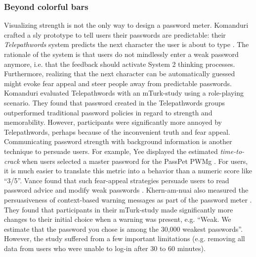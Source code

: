 	\subsubsection{Beyond colorful bars}
	Visualizing strength is not the only way to design a password meter. Komanduri \etal crafted a sly prototype to tell users their passwords are predictable: their \textit{Telepathwords} system predicts the next character the user is about to type \cite{Komanduri2014Telepathwords}. The rationale of the system is that users do not mindlessly enter a weak password anymore, i.e. that the feedback should activate System 2 thinking processes. Furthermore, realizing that the next character can be automatically guessed might evoke fear appeal and steer people away from predictable passwords. Komanduri \etal evaluated Telepathwords with an \gls{mTurk}-study using a role-playing scenario. They found that password created in the Telepathwords groups outperformed traditional password policies in regard to strength and memorability. However, participants were significantly more annoyed by Telepathwords, perhaps because of the inconvenient truth and fear appeal. 
	Communicating password strength with background information is another technique to persuade users. For example, Yee \etal displayed the estimated \textit{time-to-crack} when users selected a master password for the PassPet \gls{PWMg} \cite{Yee2006Passpet}. For users, it is much easier to translate this metric into a behavior than a numeric score like ``3/5''. Vance \etal found that such fear-appeal strategies persuade users to read password advice and modify weak passwords \cite{Vance2013FearAppeals}. Khern-am-nuai \etal also measured the persuasiveness of context-based warning messages as part of the password meter \cite{Khern-am-nuai2017ContextBasedMeter}. They found that participants in their \gls{mTurk}-study made significantly more changes to their initial choice when a warning was present, e.g. ``Weak. We estimate
	that the password you chose is among the 30,000 weakest passwords''. However, the study suffered from a few important limitations (e.g. removing all data from users who were unable to log-in after 30 to 60 minutes). 
